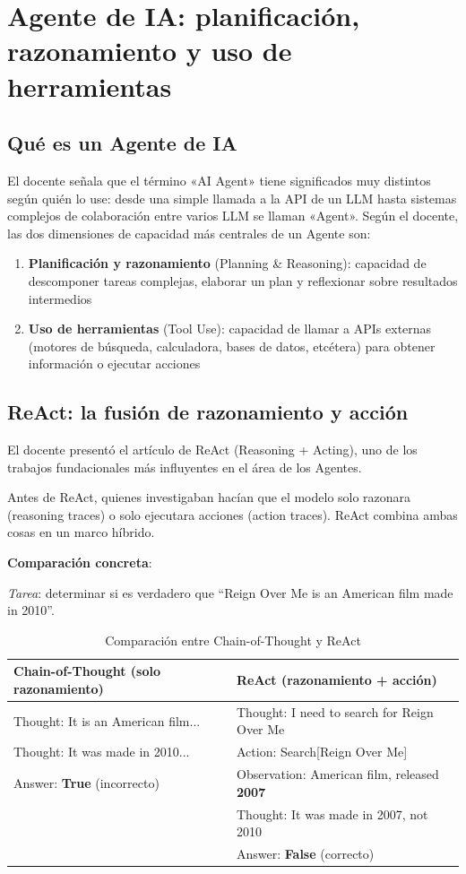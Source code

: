 \section{Agente de IA: planificación, razonamiento y uso de herramientas}

\subsection{Qué es un Agente de IA}

El docente señala que el término «AI Agent» tiene significados muy distintos según quién lo use: desde una simple llamada a la API de un LLM hasta sistemas complejos de colaboración entre varios LLM se llaman «Agent». Según el docente, las dos dimensiones de capacidad más centrales de un Agente son:

\begin{enumerate}
    \item \textbf{Planificación y razonamiento} (Planning \& Reasoning): capacidad de descomponer tareas complejas, elaborar un plan y reflexionar sobre resultados intermedios
    \item \textbf{Uso de herramientas} (Tool Use): capacidad de llamar a APIs externas (motores de búsqueda, calculadora, bases de datos, etcétera) para obtener información o ejecutar acciones
\end{enumerate}

\subsection{ReAct: la fusión de razonamiento y acción}

El docente presentó el artículo de ReAct (Reasoning + Acting), uno de los trabajos fundacionales más influyentes en el área de los Agentes.

Antes de ReAct, quienes investigaban hacían que el modelo solo razonara (reasoning traces) o solo ejecutara acciones (action traces). ReAct combina ambas cosas en un marco híbrido.

\textbf{Comparación concreta}:

\textit{Tarea}: determinar si es verdadero que ``Reign Over Me is an American film made in 2010''.

\begin{table}[H]
\centering
\begin{tabular}{p{6cm}p{6cm}}
\toprule
\textbf{Chain-of-Thought (solo razonamiento)} & \textbf{ReAct (razonamiento + acción)} \\
\midrule
Thought: It is an American film... & Thought: I need to search for Reign Over Me \\
Thought: It was made in 2010... & Action: Search{[}Reign Over Me{]} \\
Answer: \textbf{True} {\color{red}(incorrecto)} & Observation: American film, released \textbf{2007} \\
 & Thought: It was made in 2007, not 2010 \\
 & Answer: \textbf{False} {\color{green!60!black}(correcto)} \\
\bottomrule
\end{tabular}
\caption{Comparación entre Chain-of-Thought y ReAct}
\end{table}

